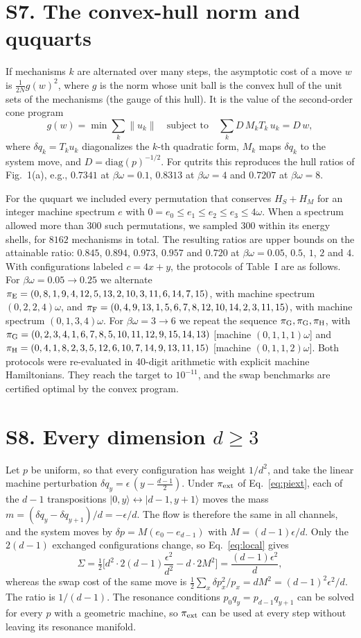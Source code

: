 \documentclass[aps,prl,reprint,superscriptaddress,amsmath,amssymb]{revtex4-2}
\begin{document}
\section{S7. The convex-hull norm and ququarts}
If mechanisms $k$ are alternated over many steps, the asymptotic cost of a move $w$ is $\tfrac{1}{2N}g(w)^2$, where $g$
is the norm whose unit ball is the convex hull of the unit sets of the mechanisms (the gauge of this hull). It is the
value of the second-order cone program
\[
g(w)=\min\sum_k\|u_k\|\quad\text{subject to}\quad\sum_k D\,M_kT_k\,u_k=D\,w ,
\]
where $\delta q_k=T_ku_k$ diagonalizes the $k$-th quadratic form, $M_k$ maps $\delta q_k$ to the system move, and
$D=\mathrm{diag}(p)^{-1/2}$. For qutrits this reproduces the hull ratios of Fig.~1(a), e.g., $0.7341$ at
$\beta\omega=0.1$, $0.8313$ at $\beta\omega=4$ and $0.7207$ at $\beta\omega=8$.

For the ququart we included every permutation that conserves $H_S+H_M$ for an integer machine spectrum $e$ with
$0=e_0\le e_1\le e_2\le e_3\le 4\omega$. When a spectrum allowed more than $300$ such permutations, we sampled $300$
within its energy shells, for $8162$ mechanisms in total. The resulting ratios are upper bounds on the attainable
ratio: $0.845$, $0.894$, $0.973$, $0.957$ and $0.720$ at $\beta\omega=0.05$, $0.5$, $1$, $2$ and $4$. With
configurations labeled $c=4x+y$, the protocols of Table~I are as follows. For $\beta\omega=0.05\to0.25$ we alternate
$\pi_{\rm E}=(0,8,1,9,4,12,5,13,2,10,3,11,6,14,7,15)$, with machine spectrum $(0,2,2,4)\omega$, and
$\pi_{\rm F}=(0,4,9,13,1,5,6,7,8,12,10,14,2,3,11,15)$, with machine spectrum $(0,1,3,4)\omega$. For
$\beta\omega=3\to6$ we repeat the sequence $\pi_{\rm G},\pi_{\rm G},\pi_{\rm H}$, with
$\pi_{\rm G}=(0,2,3,4,1,6,7,8,5,10,11,12,9,15,14,13)$ [machine $(0,1,1,1)\omega$] and
$\pi_{\rm H}=(0,4,1,8,2,3,5,12,6,10,7,14,9,13,11,15)$ [machine $(0,1,1,2)\omega$]. Both protocols were re-evaluated in
40-digit arithmetic with explicit machine Hamiltonians. They reach the target to $10^{-11}$, and the swap benchmarks
are certified optimal by the convex program.

\section{S8. Every dimension $d\geq3$}
Let $p$ be uniform, so that every configuration has weight $1/d^2$, and take the linear machine perturbation
$\delta q_y=\epsilon\,(y-\tfrac{d-1}{2})$. Under $\pi_{\rm ext}$ of Eq.~\eqref{eq:piext}, each of the $d-1$
transpositions $|0,y\rangle\leftrightarrow|d-1,y+1\rangle$ moves the mass $m=(\delta q_y-\delta q_{y+1})/d=-\epsilon/d$.
The flow is therefore the same in all channels, and the system moves by $\delta p=M(e_0-e_{d-1})$ with
$M=(d-1)\epsilon/d$. Only the $2(d-1)$ exchanged configurations change, so Eq.~\eqref{eq:local} gives
\[
\Sigma=\tfrac12\Big[d^2\cdot2(d-1)\frac{\epsilon^2}{d^2}-d\cdot2M^2\Big]=\frac{(d-1)\epsilon^2}{d},
\]
whereas the swap cost of the same move is $\tfrac12\sum_x\delta p_x^2/p_x=dM^2=(d-1)^2\epsilon^2/d$. The ratio is
$1/(d-1)$. The resonance conditions $p_0q_y=p_{d-1}q_{y+1}$ can be solved for every $p$ with a geometric machine, so
$\pi_{\rm ext}$ can be used at every step without leaving its resonance manifold.
\end{document}
